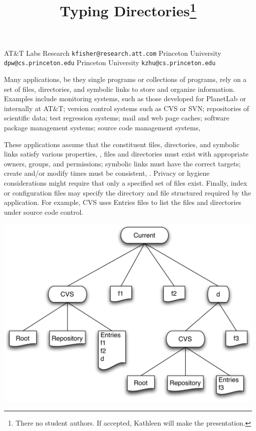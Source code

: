 \documentclass[nocopyrightspace,10pt]{sigplanconf}
\begin{document}
\title{Typing Directories\thanks{There no student authors.  If
    accepted, Kathleen will make the presentation.}}

	   {AT\&T Labs Research}
           {\small \tt kfisher@research.att.com}
	   {Princeton University}
           {\small \tt dpw@cs.princeton.edu}
	   {Princeton University}
           {\small \tt kzhu@cs.princeton.edu}
\maketitle{}
\date{}


Many applications, be they single programs or collections of programs,
rely on a set of files, directories, and symbolic links to
store and organize information.  Examples include monitoring
systems, such as those developed for PlanetLab or internally at AT\&T;
version control systems such as CVS or SVN; repositories of scientific
data; test regression systems; mail and web page caches; software
package management systems; source code management systems, \etc{}

These applications assume that the constituent files, directories, and
symbolic links satisfy various properties, \eg{}, files and
directories must exist with appropriate owners, groups, and
permissions; symbolic links must have the correct targets; create
and/or modify times must be consistent, \etc.  Privacy or hygiene
considerations might require that only a specified set of files exist.
Finally, index or configuration files may specify the directory and
file structured required by the application.  For example, CVS uses 
Entries files to list the files and directories under source code
control.  

\includegraphics[width=\columnwidth]{CVSStructure.pdf}
\end{document}
